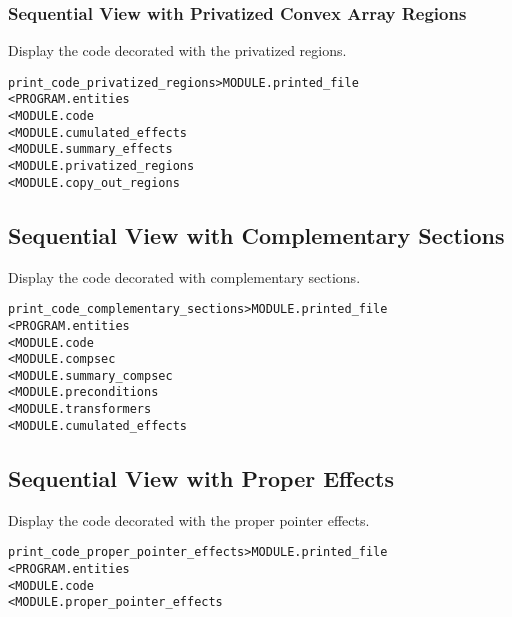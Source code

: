 \documentclass[a4paper]{report}
\newenvironment{PipsMake}{\begin{alltt}}{\end{alltt}}
\newenvironment{PipsPass}[1]{\label{pass:#1}}{}
\begin{document}
\subsubsection{Sequential View with Privatized Convex Array Regions}

\begin{PipsPass}{print_code_privatized_regions}
Display the code decorated with the privatized regions.
\end{PipsPass}

\begin{PipsMake}
print_code_privatized_regions       > MODULE.printed_file
        < PROGRAM.entities
        < MODULE.code
        < MODULE.cumulated_effects
        < MODULE.summary_effects
        < MODULE.privatized_regions
        < MODULE.copy_out_regions
\end{PipsMake}

\subsection{Sequential View with Complementary Sections}

\begin{PipsPass}{print_code_complementary_sections}
Display the code decorated with complementary sections.
\end{PipsPass}

\begin{PipsMake}
print_code_complementary_sections > MODULE.printed_file
        < PROGRAM.entities
        < MODULE.code
        < MODULE.compsec
        < MODULE.summary_compsec
        < MODULE.preconditions
        < MODULE.transformers
        < MODULE.cumulated_effects
\end{PipsMake}

\subsection{Sequential View with Proper Effects}

\begin{PipsPass}{print_code_proper_pointer_effects}
Display the code decorated with the proper pointer effects.
\end{PipsPass}

\begin{PipsMake}
print_code_proper_pointer_effects       > MODULE.printed_file
        < PROGRAM.entities
        < MODULE.code
        < MODULE.proper_pointer_effects
\end{PipsMake}
\end{document}
